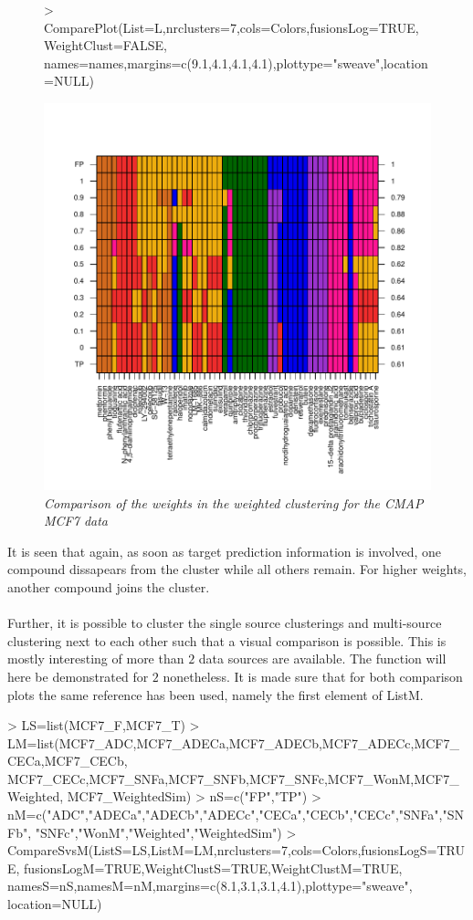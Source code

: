 \documentclass[a4paper]{article}
\begin{document}
\newpage
\begin{figure}[!h] 
\centering
\begin{Schunk}
\begin{Sinput}
> ComparePlot(List=L,nrclusters=7,cols=Colors,fusionsLog=TRUE,WeightClust=FALSE,
             names=names,margins=c(9.1,4.1,4.1,4.1),plottype="sweave",location=NULL)
\end{Sinput}
\end{Schunk}
\includegraphics{IntClustVignette-ComparePlot2}
\caption{{\it Comparison of the weights in the weighted clustering for the CMAP
MCF7 data}\label{MCF7_Weights}}
\end{figure}
\noindent It is seen that again, as soon as target prediction information is
involved, one compound dissapears from the cluster while all others remain. For higher
weights, another compound joins the cluster.\\ \\
Further, it is possible to cluster the single source clusterings and
multi-source clustering next to each other such that a visual comparison is
possible. This is mostly interesting of more than $2$ data sources are
available. The function will here be demonstrated for $2$ nonetheless.
It is made sure that for both comparison plots the same reference has been used,
namely the first element of ListM.
\begin{Schunk}
\begin{Sinput}
> LS=list(MCF7_F,MCF7_T)
> LM=list(MCF7_ADC,MCF7_ADECa,MCF7_ADECb,MCF7_ADECc,MCF7_CECa,MCF7_CECb,
 		MCF7_CECc,MCF7_SNFa,MCF7_SNFb,MCF7_SNFc,MCF7_WonM,MCF7_Weighted,
 		MCF7_WeightedSim)
> nS=c("FP","TP")
> nM=c("ADC","ADECa","ADECb","ADECc","CECa","CECb","CECc","SNFa","SNFb",
       "SNFc","WonM","Weighted","WeightedSim")
> CompareSvsM(ListS=LS,ListM=LM,nrclusters=7,cols=Colors,fusionsLogS=TRUE,
             fusionsLogM=TRUE,WeightClustS=TRUE,WeightClustM=TRUE,
             namesS=nS,namesM=nM,margins=c(8.1,3.1,3.1,4.1),plottype="sweave",
             location=NULL)
\end{Sinput}
\end{Schunk}
\end{document}
